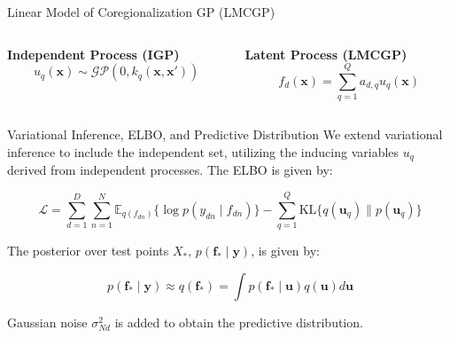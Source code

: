 \begin{frame}{Linear Model of Coregionalization GP (LMCGP)}
	\centering
	\setlength{} 
	\setlength{}
	
	
	\begin{columns}[T] %

		\begin{column}{0.5\textwidth}
			\centering
	\textcolor{mygreen}{
		\textbf{Independent Process (IGP)}
		\begin{equation*}
			u_{q}(\mathbf{x}) \sim \mathcal{GP}(0, k_{q}(\mathbf{x}, \mathbf{x}'))
		\end{equation*}
	}
	\end{column}
	
	
	\begin{column}{0.5\textwidth}
		\centering
		\textcolor{myblue}{
			\textbf{Latent Process (LMCGP)}
			\begin{equation*}
				f_{d}(\mathbf{x}) = \sum_{q=1}^Q a_{d,q} u_{q}(\mathbf{x})
			\end{equation*}	
		}
	\end{column}
	
	\end{columns}
\end{frame}


\begin{frame}{Variational Inference, ELBO, and Predictive Distribution}
	We extend variational inference to include the independent set, utilizing the inducing variables $u_q$ derived from independent processes. The ELBO is given by:
	
	\begin{equation*}\label{eq:lmc_elbo}
		\mathcal{L} = \sum_{d=1}^D\sum_{n=1}^{N} \mathbb{E}_{q(f_{dn})}\{\log p(y_{dn} \mid f_{dn})\} - \sum_{q=1}^Q \text{KL}\{q(\mathbf{u}_q)\parallel p(\mathbf{u}_q)\}
	\end{equation*}
	
	The posterior over test points $X_*$, $p(\mathbf{f}_* \mid \mathbf{y})$, is given by:
	
	\begin{equation*}
		p(\mathbf{f}_* \mid \mathbf{y}) \approx q(\mathbf{f}_*) = \int p(\mathbf{f}_* \mid \mathbf{u}) q(\mathbf{u}) d \mathbf{u}
	\end{equation*}
	
	Gaussian noise $\sigma_{Nd}^2$ is added to obtain the predictive distribution.
\end{frame}

